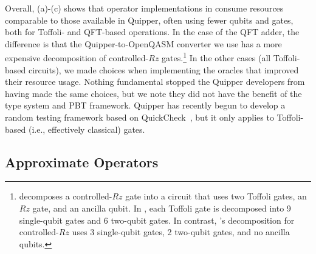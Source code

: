 Overall, (a)-(c) shows that operator
implementations in \vqir consume resources comparable to those
available in Quipper, often using fewer qubits and gates, both for
Toffoli- and QFT-based operations.
In the case of the QFT adder, the difference is that the Quipper-to-OpenQASM converter we use has a more expensive decomposition of controlled-$Rz$ gates.\footnote{\citet{quipper-qasm} decomposes a controlled-$Rz$ gate into a circuit that uses two Toffoli gates, an $Rz$ gate, and an ancilla qubit. In \voqc, each Toffoli gate is decomposed into 9 single-qubit gates and 6 two-qubit gates. In contrast, \name's decomposition for controlled-$Rz$ uses 3 single-qubit gates, 2 two-qubit gates, and no ancilla qubits.}
In the other cases (all Toffoli-based circuits), we made choices
when implementing the oracles that improved their
resource usage. Nothing fundamental stopped the Quipper
developers from having made the same choices, but we note they did
not have the benefit of the \oqasm type system and PBT
framework. Quipper has recently begun to develop a random testing
framework based on QuickCheck~\cite{10.1145/351240.351266},
but it only applies to Toffoli-based (i.e., effectively classical) gates.

\subsection{Approximate Operators}
\label{sec:approx-circs}


